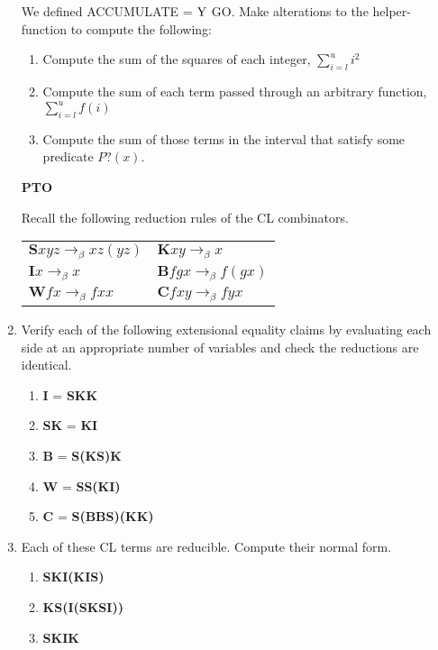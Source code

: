 \documentclass[11pt]{report}
\begin{document}
\begin{enumerate}
	 We defined ACCUMULATE = $\text{Y}$ GO. Make alterations to the helper-function to compute the following: 
	
	 \begin{enumerate}
	 	\item Compute the sum of the squares of each integer, $\sum_{i=l}^u i^{2}$
	 	\item Compute the sum of each term passed through an arbitrary function, $\sum_{i=l}^u f(i)$
	 	\item Compute the sum of those terms in the interval that satisfy some predicate $P?(x)$.
	 \end{enumerate}
	 
	 \vfill
	 \hfill \textbf{PTO}



\newpage

Recall the following reduction rules of the CL combinators. 
\begin{tabular}{l l}
$\textbf{S}xyz \to_{\beta} xz(yz)$ & $\textbf{K}xy \to_{\beta} x$ \\
$\textbf{I}x \to_{\beta} x$ & $\textbf{B}fgx \to_{\beta}f(gx)$ \\
$\textbf{W}fx \to_{\beta}fxx$ & $\textbf{C}fxy \to_{\beta} fyx$
\end{tabular}

\item Verify each of the following extensional equality claims by evaluating each side at an appropriate number of variables and check the reductions are identical.

	\begin{enumerate}
		\item \textbf{I} = \textbf{SKK}
		\item \textbf{SK} = \textbf{KI}
		\item \textbf{B} = \textbf{S(KS)K}
		\item \textbf{W} = \textbf{SS(KI)}
		\item \textbf{C} = \textbf{S(BBS)(KK)}	
	\end{enumerate}

\item Each of these CL terms are reducible. Compute their normal form.

	\begin{enumerate}
		\item \textbf{SKI(KIS)}
		\item \textbf{KS(I(SKSI))}
		\item \textbf{SKIK}	
	\end{enumerate}


\end{enumerate}
\end{document}
